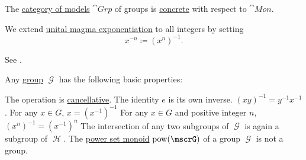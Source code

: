 \begin{definition}
\begin{thmenum}
     The \hyperref[def:category_of_first_order_models]{category of models} \( \cat{Grp} \) of groups is \hyperref[def:concrete_category]{concrete} with respect to \hyperref[def:unital_magma/associative]{\( \cat{Mon} \)}.

     We extend \hyperref[def:unital_magma/exponentiation]{unital magma exponentiation} to all integers by setting
    \begin{equation*}
      x^{-n} \coloneqq (x^n)^{-1}.
    \end{equation*}

    See .
  \end{thmenum}
\end{definition}

\begin{proposition}\label{thm:group_properties}
  Any \hyperref[def:group]{group} \( \mscrG \) has the following basic properties:
  \begin{thmenum}
     The operation is \hyperref[def:magma/cancellative]{cancellative}.
     The identity \( e \) is its own inverse.
     \( (xy)^{-1} = y^{-1} x^{-1} \).
     For any \( x \in G \), \( x = (x^{-1})^{-1} \)
     For any \( x \in G \) and positive integer \( n \), \( (x^n)^{-1} = (x^{-1})^n \)
     The intersection of any two subgroups of \( \mscrG \) is again a subgroup of \( \mscrH \).
     The \hyperref[def:magma/power_set]{power set monoid} \( \pow(\mscrG) \) of a group \( \mscrG \) is not a group.
  \end{thmenum}
\end{proposition}
